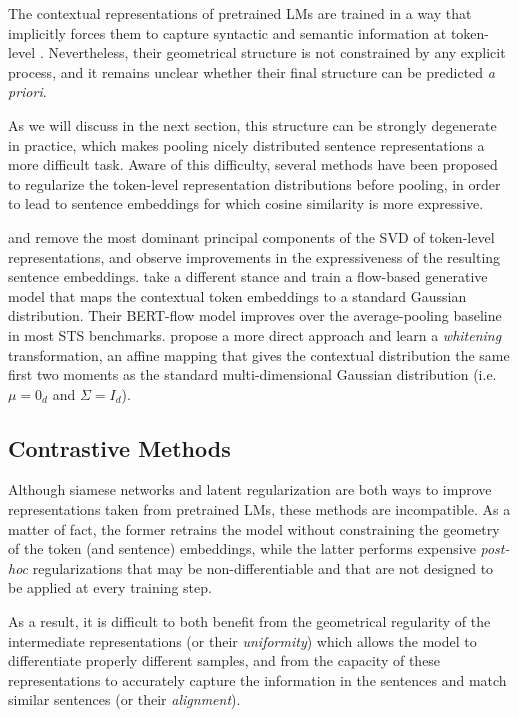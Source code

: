 The contextual representations of pretrained LMs are trained in a way that implicitly forces them to capture syntactic and semantic information at token-level \citep{jawahar-etal-2019-bert}. Nevertheless, their geometrical structure is not constrained by any explicit process, and it remains unclear whether their final structure can be predicted \textit{a priori}.

As we will discuss in the next section, this structure can be strongly degenerate in practice, which makes pooling nicely distributed sentence representations a more difficult task. Aware of this difficulty, several methods have been proposed to regularize the token-level representation distributions before pooling, in order to lead to sentence embeddings for which cosine similarity is more expressive.

\citet{arora2017a} and \citet{mu2018allbutthetop} remove the most dominant principal components of the SVD of token-level representations, and observe improvements in the expressiveness of the resulting sentence embeddings. \citet{li-etal-2020-sentence} take a different stance and train a flow-based generative model that maps the contextual token embeddings to a standard Gaussian distribution. Their BERT-flow model improves over the average-pooling baseline in most STS benchmarks. \citet{su2021whiteningsentencerepresentationsbetter} propose a more direct approach and learn a \textit{whitening} transformation, an affine mapping that gives the contextual distribution the same first two moments as the standard multi-dimensional Gaussian distribution (i.e. $\mu = 0_d$ and $\Sigma = I_d$).

\subsection{Contrastive Methods}
\label{ssec:contrastive}

Although siamese networks and latent regularization are both ways to improve representations taken from pretrained LMs, these methods are incompatible. As a matter of fact, the former retrains the model without constraining the geometry of the token (and sentence) embeddings, while the latter performs expensive \textit{post-hoc} regularizations that may be non-differentiable and that are not designed to be applied at every training step.

As a result, it is difficult to both benefit from the geometrical regularity of the intermediate representations (or their \textit{uniformity}) which allows the model to differentiate properly different samples, and from the capacity of these representations to accurately capture the information in the sentences and match similar sentences (or their \textit{alignment}).


